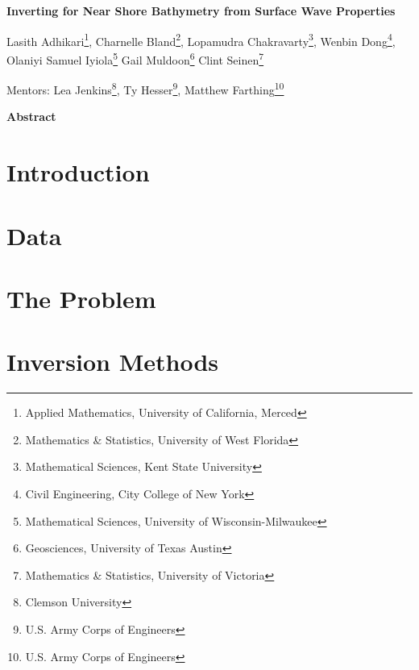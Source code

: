 \documentclass[12pt]{article}
\begin{document}
\centerline{\large \bf Inverting for Near Shore Bathymetry from Surface Wave Properties}

\vspace{.1truein}

\def\thefootnote{\arabic{footnote}}
\begin{center}
	Lasith Adhikari\footnote{Applied Mathematics, University of California, Merced},
	Charnelle Bland\footnote{Mathematics \& Statistics,  University of West Florida},
  Lopamudra Chakravarty\footnote{Mathematical Sciences, Kent State University},
  Wenbin Dong\footnote{Civil Engineering, City College of New York},\\
 Olaniyi Samuel Iyiola\footnote{Mathematical Sciences, University of Wisconsin-Milwaukee}
 Gail Muldoon\footnote{Geosciences, University of Texas Austin}
 Clint Seinen\footnote{Mathematics \& Statistics, University of Victoria}

\end{center}


\begin{center}
Mentors: Lea Jenkins\footnote{Clemson University},
Ty Hesser\footnote{U.S. Army Corps of Engineers},
Matthew Farthing\footnote{U.S. Army Corps of Engineers}
\end{center}


\vspace{.3truein}
\centerline{\bf Abstract}



\section{Introduction}



\section{Data}






\section{The Problem}



\section{Inversion Methods} \label{inv_techniques}


\end{document}
